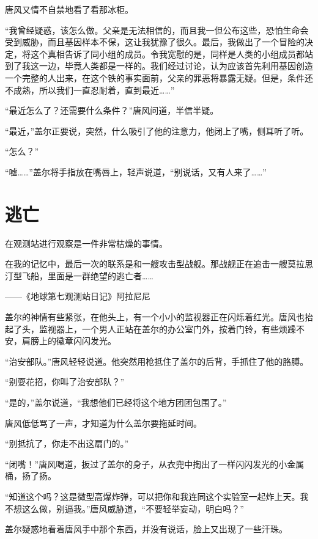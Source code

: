 唐风又情不自禁地看了看那冰柜。

“我曾经疑惑，该怎么做。父亲是无法相信的，而且我一但公布这些，恐怕生命会受到威胁，而且基因样本不保，这让我犹豫了很久。最后，我做出了一个冒险的决定，将这个真相告诉了同小组的成员。令我宽慰的是，同样是人类的小组成员都站到了我这一边，毕竟人类都是一样的。我们经过讨论，认为应该首先利用基因创造一个完整的人出来，在这个铁的事实面前，父亲的罪恶将暴露无疑。但是，条件还不成熟，所以我们一直忍耐着，直到最近……”

“最近怎么了？还需要什么条件？”唐风问道，半信半疑。

“最近，”盖尔正要说，突然，什么吸引了他的注意力，他闭上了嘴，侧耳听了听。

“怎么？”

“嘘……”盖尔将手指放在嘴唇上，轻声说道，“别说话，又有人来了……”

\chapter{逃亡}
\begin{myquote}
在观测站进行观察是一件非常枯燥的事情。

在我的记忆中，最后一次的联系是和一艘攻击型战舰。那战舰正在追击一艘莫拉思汀型飞船，里面是一群绝望的逃亡者……
\end{myquote}

\begin{myflushright}    
——《地球第七观测站日记》阿拉尼尼
\end{myflushright}

盖尔的神情有些紧张，在他头上，有一个小小的监视器正在闪烁着红光。唐风也抬起了头，监视器上，一个男人正站在盖尔的办公室门外，按着门铃，有些烦躁不安，肩膀上的徽章闪闪发光。

“治安部队。”唐风轻轻说道。他突然用枪抵住了盖尔的后背，手抓住了他的胳膊。

“别耍花招，你叫了治安部队？”

“是的，”盖尔说道，“我想他们已经将这个地方团团包围了。”

唐风低低骂了一声，才知道为什么盖尔要拖延时间。

“别抵抗了，你走不出这扇门的。”

“闭嘴！”唐风喝道，扳过了盖尔的身子，从衣兜中掏出了一样闪闪发光的小金属桶，扬了扬。

“知道这个吗？这是微型高爆炸弹，可以把你和我连同这个实验室一起炸上天。我不想这么做，别逼我。”唐风威胁道，“不要轻举妄动，明白吗？”

盖尔疑惑地看着唐风手中那个东西，并没有说话，脸上又出现了一些汗珠。

